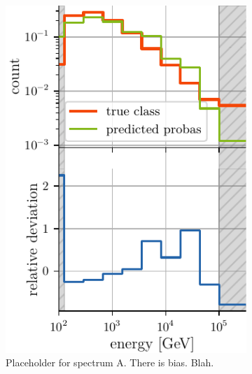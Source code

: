 \begin{figure}[H]
    \centering
    \begin{subfigure}{0.45\textwidth}
        \centering
        \includegraphics[width=\textwidth]{content/plots/bootstrap:spectrum_half.pdf}
        \caption{
            Placeholder for spectrum A.
            There is bias. Blah.
        }
    \end{subfigure}
    \begin{subfigure}{0.45\textwidth}
        \centering

\end{subfigure}
\end{figure}
